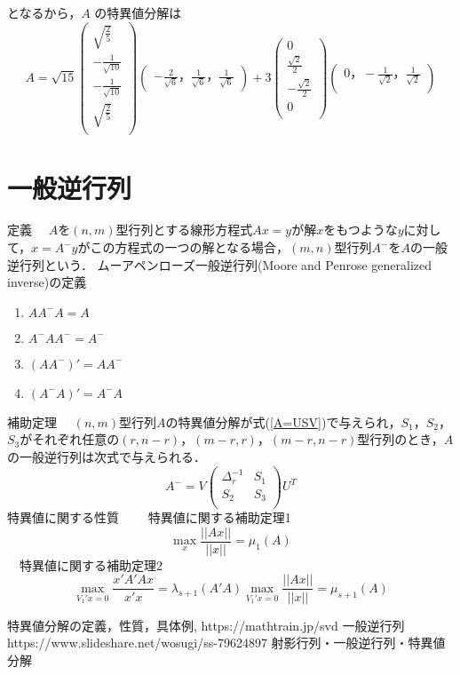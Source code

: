 \documentclass[12pt]{jsarticle}
\begin{document}
となるから，$A$ の特異値分解は
\begin{equation}
  \label{}
  A = \sqrt{15} \left( \begin{array}{rrcr}
  \sqrt{\frac{2}{5}}   \\
  -\frac{1}{\sqrt{10}} \\
  -\frac{1}{\sqrt{10}} \\
  \sqrt{\frac{2}{5}}   \\
  \end{array} \right)
  \left( \begin{array}{rrcr}
  -\frac{2}{\sqrt{6}}，\frac{1}{\sqrt{6}}，\frac{1}{\sqrt{6}}
  \end{array} \right)
  +3
  \left( \begin{array}{rrcr}
  0 \\
  \frac{\sqrt{2}}{2} \\
  -\frac{\sqrt{2}}{2} \\
  0 \\
  \end{array} \right)
  \left( \begin{array}{rrcr}
  0，-\frac{1}{\sqrt{2}}，\frac{1}{\sqrt{2}}\\
  \end{array} \right)
\end{equation}
\section{一般逆行列}

定義
　$A$を$(n,m)$型行列とする線形方程式$Ax=y$が解$x$をもつような$y$に対して，$x=A^-y$がこの方程式の一つの解となる場合，$(m,n)$型行列$A^-$を$A$の一般逆行列という．
ムーアペンローズ一般逆行列(Moore and Penrose generalized inverse)の定義
\begin{enumerate}
  \item $AA^-A = A$
  \item $A^-AA^- = A^-$
  \item $(A A^-)' = AA^-$
  \item $(A^- A)' = A^-A$
\end{enumerate}
補助定理
　$(n,m)$型行列$A$の特異値分解が式(\ref{A=USV})で与えられ，$S_1$，$S_2$，$S_3$がそれぞれ任意の$(r,n-r)$，$(m-r,r)$，$(m-r,n-r)$型行列のとき，$A$の一般逆行列は次式で与えられる．
\begin{equation}
  A^-=V \left( \begin{array}{rrcr}
  \Delta_r^{-1} & S_1 \\
  S_2 & S_3\\
  \end{array} \right)
  U^T
\end{equation}
特異値に関する性質　
　特異値に関する補助定理1
\begin{equation}
  \max_x \frac{||Ax||}{||x||} = \mu_1(A)
\end{equation}
　特異値に関する補助定理2
\begin{equation}
  \max_{V_1'x=0} \frac{x'A'Ax}{x'x} = \lambda_{s+1}(A'A)
  \max_{V_1'x=0} \frac{||Ax||}{||x||} = \mu_{s+1}(A)
\end{equation}

\begin{thebibliography}{9}
   特異値分解の定義，性質，具体例, https://mathtrain.jp/svd
  \bibitem{} 一般逆行列 https://www.slideshare.net/wosugi/ss-79624897
  \bibitem{} 射影行列・一般逆行列・特異値分解 
\end{thebibliography}
\end{document}
